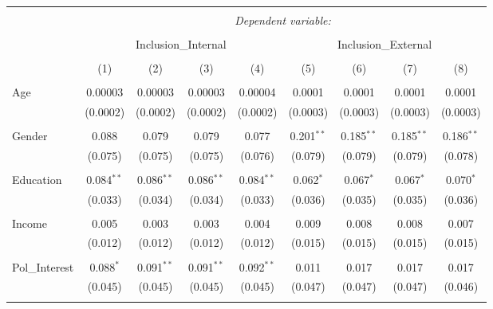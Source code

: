 
\begin{table}[!htbp] \centering 
  \caption{} 
  \label{} 
\begin{tabular}{@{\extracolsep{5pt}}lcccccccc} 
\\[-1.8ex]\hline 
\hline \\[-1.8ex] 
 & \multicolumn{8}{c}{\textit{Dependent variable:}} \\ 
\cline{2-9} 
\\[-1.8ex] & \multicolumn{4}{c}{Inclusion\_Internal} & \multicolumn{4}{c}{Inclusion\_External} \\ 
\\[-1.8ex] & (1) & (2) & (3) & (4) & (5) & (6) & (7) & (8)\\ 
\hline \\[-1.8ex] 
 Age & 0.00003 & 0.00003 & 0.00003 & 0.00004 & 0.0001 & 0.0001 & 0.0001 & 0.0001 \\ 
  & (0.0002) & (0.0002) & (0.0002) & (0.0002) & (0.0003) & (0.0003) & (0.0003) & (0.0003) \\ 
  & & & & & & & & \\ 
 Gender & 0.088 & 0.079 & 0.079 & 0.077 & 0.201$^{**}$ & 0.185$^{**}$ & 0.185$^{**}$ & 0.186$^{**}$ \\ 
  & (0.075) & (0.075) & (0.075) & (0.076) & (0.079) & (0.079) & (0.079) & (0.078) \\ 
  & & & & & & & & \\ 
 Education & 0.084$^{**}$ & 0.086$^{**}$ & 0.086$^{**}$ & 0.084$^{**}$ & 0.062$^{*}$ & 0.067$^{*}$ & 0.067$^{*}$ & 0.070$^{*}$ \\ 
  & (0.033) & (0.034) & (0.034) & (0.033) & (0.036) & (0.035) & (0.035) & (0.036) \\ 
  & & & & & & & & \\ 
 Income & 0.005 & 0.003 & 0.003 & 0.004 & 0.009 & 0.008 & 0.008 & 0.007 \\ 
  & (0.012) & (0.012) & (0.012) & (0.012) & (0.015) & (0.015) & (0.015) & (0.015) \\ 
  & & & & & & & & \\ 
 Pol\_Interest & 0.088$^{*}$ & 0.091$^{**}$ & 0.091$^{**}$ & 0.092$^{**}$ & 0.011 & 0.017 & 0.017 & 0.017 \\ 
  & (0.045) & (0.045) & (0.045) & (0.045) & (0.047) & (0.047) & (0.047) & (0.046) \\ 
  & & & & & & & & \\ 

\end{tabular}
\end{table}
